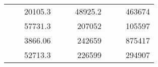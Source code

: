 \begin{table}[]
\begin{tabular}{|ccrccrccc}
\rowcolor[HTML]{DDFDFF} 
\multicolumn{1}{|c|}{\cellcolor[HTML]{FFFFC7}}                                & \multicolumn{1}{c|}{\cellcolor[HTML]{DDFDFF}}                      & \multicolumn{1}{r|}{\cellcolor[HTML]{DAE8FC}20105.3}   & \multicolumn{1}{c|}{\cellcolor[HTML]{FFFFC7}}                                & \multicolumn{1}{c|}{\cellcolor[HTML]{DDFDFF}}                       & \multicolumn{1}{r|}{\cellcolor[HTML]{DDFDFF}48925.2}   & \multicolumn{1}{c|}{\cellcolor[HTML]{FFFFC7}}                                & \multicolumn{1}{c|}{\cellcolor[HTML]{DDFDFF}}                      & \multicolumn{1}{r|}{\cellcolor[HTML]{DDFDFF}463674}    \\ \cline{3-3} \cline{6-6} \cline{9-9} 
\multicolumn{1}{|c|}{\cellcolor[HTML]{FFFFC7}}                                & \multicolumn{1}{c|}{\cellcolor[HTML]{DDFDFF}}                      & \multicolumn{1}{r|}{\cellcolor[HTML]{DDFDFF}57731.3}   & \multicolumn{1}{c|}{\cellcolor[HTML]{FFFFC7}}                                & \multicolumn{1}{c|}{\cellcolor[HTML]{DDFDFF}}                       & \multicolumn{1}{r|}{\cellcolor[HTML]{DAE8FC}207052}    & \multicolumn{1}{c|}{\cellcolor[HTML]{FFFFC7}}                                & \multicolumn{1}{c|}{\cellcolor[HTML]{DDFDFF}}                      & \multicolumn{1}{r|}{\cellcolor[HTML]{DAE8FC}105597}    \\ \cline{3-3} \cline{6-6} \cline{9-9} 
\rowcolor[HTML]{DDFDFF} 
\multicolumn{1}{|c|}{\cellcolor[HTML]{FFFFC7}}                                & \multicolumn{1}{c|}{\cellcolor[HTML]{DDFDFF}}                      & \multicolumn{1}{r|}{\cellcolor[HTML]{DAE8FC}3866.06}   & \multicolumn{1}{c|}{\cellcolor[HTML]{FFFFC7}}                                & \multicolumn{1}{c|}{\cellcolor[HTML]{DDFDFF}}                       & \multicolumn{1}{r|}{\cellcolor[HTML]{DDFDFF}242659}    & \multicolumn{1}{c|}{\cellcolor[HTML]{FFFFC7}}                                & \multicolumn{1}{c|}{\cellcolor[HTML]{DDFDFF}}                      & \multicolumn{1}{r|}{\cellcolor[HTML]{DDFDFF}875417}    \\ \cline{3-3} \cline{6-6} \cline{9-9} 
\multicolumn{1}{|c|}{\cellcolor[HTML]{FFFFC7}}                                & \multicolumn{1}{c|}{\cellcolor[HTML]{DDFDFF}}                      & \multicolumn{1}{r|}{\cellcolor[HTML]{DDFDFF}52713.3}   & \multicolumn{1}{c|}{\cellcolor[HTML]{FFFFC7}}                                & \multicolumn{1}{c|}{\cellcolor[HTML]{DDFDFF}}                       & \multicolumn{1}{r|}{\cellcolor[HTML]{DAE8FC}226599}    & \multicolumn{1}{c|}{\cellcolor[HTML]{FFFFC7}}                                & \multicolumn{1}{c|}{\cellcolor[HTML]{DDFDFF}}                      & \multicolumn{1}{r|}{\cellcolor[HTML]{DAE8FC}294907}    \\ \cline{3-3} \cline{6-6} \cline{9-9} 

\end{tabular}
\end{table}
